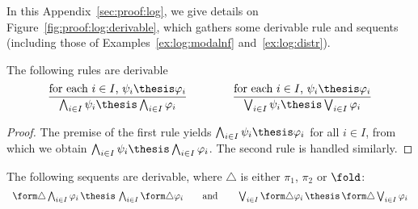 \noindent
In this Appendix~\ref{sec:proof:log},
we give details on Figure~\ref{fig:proof:log:derivable},
which gathers some derivable rule and sequents
(including those of Examples~\ref{ex:log:modalnf} and~\ref{ex:log:distr}).


\begin{lemma}
\label{lem:proof:log:functprop}
The following rules are derivable
\[
\begin{array}{c}

\dfrac{\text{for each $i \in I$, $\psi_i \thesis \varphi_i$}}
  {\bigwedge_{i \in I} \psi_i \thesis \bigwedge_{i \in I}\varphi_i}

\qquad\qquad

\dfrac{\text{for each $i \in I$, $\psi_i \thesis \varphi_i$}}
  {\bigvee_{i \in I} \psi_i \thesis \bigvee_{i \in I}\varphi_i}

\end{array}
\]
\end{lemma}

\begin{proof}
The premise of the first rule
yields
$\bigwedge_{i \in I} \psi_i \thesis \varphi_i$
for all $i \in I$, from which we obtain
$\bigwedge_{i \in I} \psi_i \thesis \bigwedge_{i \in I} \varphi_i$.
The second rule is handled similarly.
\end{proof}




\begin{lemma}
The following sequents are derivable,
where $\triangle$ is either $\pi_1$, $\pi_2$ or $\fold$:
\[
\begin{array}{c}

  \form\triangle \bigwedge_{i \in I} \varphi_i
  \,\thesis\,
  \bigwedge_{i \in I} \form\triangle \varphi_i

\qquad\text{and}\qquad

  \bigvee_{i \in I} \form\triangle\varphi_i
  \,\thesis\,
  \form\triangle \bigvee_{i \in I}\varphi_i

\end{array}
\]
\end{lemma}

